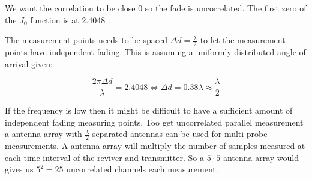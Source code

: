 We want the correlation to be close 0 so the fade is uncorrelated. The first zero of the $J_0$ function is at 2.4048 \citep[p.335]{Jakes_microwave}.



The measurement points needs to be spaced $\Delta d = \frac{\lambda}{2}$ to let the measurement points have independent fading. This is assuming a uniformly distributed angle of arrival given:

\begin{equation}
\frac{2\pi \Delta d}{\lambda} = 2.4048 \Leftrightarrow \Delta d = 0.38 \lambda \approx \frac{\lambda}{2}
\end{equation}

If the frequency is low then it might be difficult to have a sufficient amount of independent fading measuring points. \citep[p.11]{UWMeasurement} Too get uncorrelated  parallel measurement a antenna array with $\frac{\lambda}{2}$ separated antennas can be used for multi probe measurements. A antenna array will multiply the number of samples measured at each time interval of the reviver and transmitter. So a $5\cdot 5$ antenna array would gives us $5^2 = 25$ uncorrelated channels each measurement.




